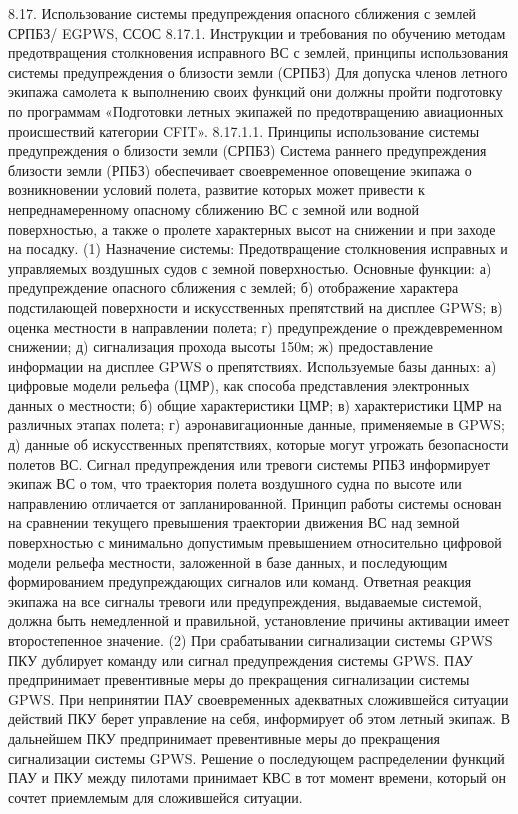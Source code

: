 8.17. Использование системы предупреждения опасного сближения с землей 
         СРПБЗ/ EGPWS, ССОС 
8.17.1. Инструкции и требования по обучению методам предотвращения столкновения исправного ВС с землей, принципы использования системы предупреждения о близости земли (СРПБЗ)
Для допуска членов летного экипажа самолета к выполнению своих функций они должны пройти подготовку по программам «Подготовки летных экипажей по предотвращению авиационных происшествий категории CFIT».
8.17.1.1.	Принципы использование системы предупреждения о близости земли (СРПБЗ)
Система раннего предупреждения близости земли (РПБЗ) обеспечивает своевременное оповещение экипажа о возникновении условий полета, развитие которых может привести к непреднамеренному опасному сближению ВС с земной или водной поверхностью, а также о пролете характерных высот на снижении и при заходе на посадку. 
(1) Назначение системы:
Предотвращение столкновения исправных и управляемых воздушных судов с земной поверхностью.
Основные функции:
а)	предупреждение опасного сближения с землей;
б)	отображение характера подстилающей поверхности и искусственных препятствий на дисплее GPWS;
в)	оценка местности в направлении полета;
г)	предупреждение о преждевременном снижении;
д)	сигнализация прохода высоты 150м;
ж)  предоставление информации на дисплее GPWS о препятствиях.
Используемые базы данных:
а)	цифровые модели рельефа (ЦМР), как способа представления электронных данных о местности;
б)	общие характеристики ЦМР;
в)	характеристики ЦМР на различных этапах полета;
г)	аэронавигационные данные, применяемые в GPWS;
д)	данные об искусственных препятствиях, которые могут угрожать безопасности полетов ВС.
Сигнал предупреждения или тревоги системы РПБЗ информирует экипаж ВС о том, что траектория полета воздушного судна по высоте или направлению отличается от запланированной.
Принцип работы системы основан на сравнении текущего превышения траектории движения ВС над земной поверхностью с минимально допустимым превышением относительно цифровой модели рельефа местности, заложенной в базе данных, и последующим формированием предупреждающих сигналов или команд.
Ответная реакция экипажа на все сигналы тревоги или предупреждения, выдаваемые системой, должна быть немедленной и правильной, установление причины активации имеет второстепенное значение.
(2) При срабатывании сигнализации системы GPWS ПКУ дублирует команду или сигнал предупреждения системы GPWS. ПАУ предпринимает превентивные меры до прекращения сигнализации системы GPWS. При непринятии ПАУ своевременных адекватных сложившейся ситуации действий ПКУ берет управление на себя, информирует об этом летный экипаж. В дальнейшем ПКУ предпринимает превентивные меры до прекращения сигнализации системы GPWS. Решение о последующем распределении функций ПАУ и ПКУ между пилотами принимает КВС в тот момент времени, который он сочтет приемлемым для сложившейся ситуации.

